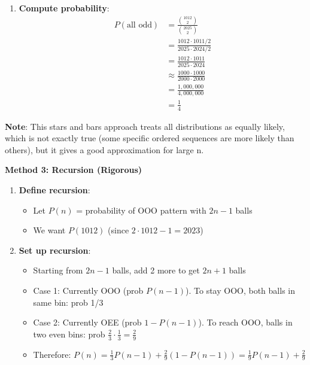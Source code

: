 \documentclass[12pt]{article}
\begin{document}
\begin{solutionbox}
\begin{enumerate}
    \item \textbf{Compute probability}:
    \begin{align}
    P(\text{all odd}) &= \frac{\binom{1012}{2}}{\binom{2025}{2}}\\
    &= \frac{1012 \cdot 1011 / 2}{2025 \cdot 2024 / 2}\\
    &= \frac{1012 \cdot 1011}{2025 \cdot 2024}\\
    &\approx \frac{1000 \cdot 1000}{2000 \cdot 2000}\\
    &= \frac{1,000,000}{4,000,000}\\
    &= \frac{1}{4}
    \end{align}
\end{enumerate}

\textbf{Note}: This stars and bars approach treats all distributions as equally likely, which is not exactly true (some specific ordered sequences are more likely than others), but it gives a good approximation for large n.

\textbf{Method 3: Recursion (Rigorous)}

\begin{enumerate}
    \item \textbf{Define recursion}:
    \begin{itemize}
        \item Let $P(n)$ = probability of OOO pattern with $2n-1$ balls
        \item We want $P(1012)$ (since $2 \cdot 1012 - 1 = 2023$)
    \end{itemize}
    
    \item \textbf{Set up recursion}:
    \begin{itemize}
        \item Starting from $2n-1$ balls, add 2 more to get $2n+1$ balls
        \item Case 1: Currently OOO (prob $P(n-1)$). To stay OOO, both balls in same bin: prob 1/3
        \item Case 2: Currently OEE (prob $1 - P(n-1)$). To reach OOO, balls in two even bins: prob $\frac{2}{3} \cdot \frac{1}{3} = \frac{2}{9}$
        \item Therefore: $P(n) = \frac{1}{3}P(n-1) + \frac{2}{9}(1 - P(n-1)) = \frac{1}{9}P(n-1) + \frac{2}{9}$
    \end{itemize}
    

\end{enumerate}
\end{solutionbox}
\end{document}
